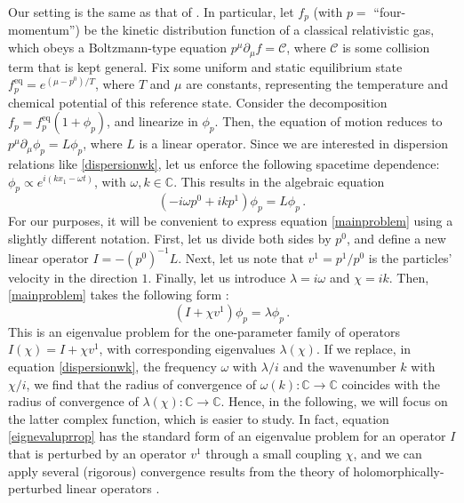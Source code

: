 \documentclass[a4paper, amsfonts, amssymb, amsmath, reprint, showkeys, nofootinbib, twoside, onecolumn,notitlepage]{revtex4-2}
\theoremstyle{definition}
\theoremstyle{theorem}
\theoremstyle{corollary}
\begin{document}
Our setting is the same as that of \cite{GavassinoGapless2024rck}. In particular, let $f_p$ (with $p=$ ``four-momentum'') be the kinetic distribution function of a classical relativistic gas, which obeys a Boltzmann-type equation $p^\mu \partial_\mu f=\mathcal{C}$, where $\mathcal{C}$ is some collision term that is kept general. Fix some uniform and static equilibrium state $f^{\text{eq}}_p=e^{(\mu-p^0)/T}$, where $T$ and $\mu$ are constants, representing the temperature and chemical potential of this reference state. Consider the decomposition $f_p=f^{\text{eq}}_p(1+\phi_p)$, and linearize in $\phi_p$. Then, the equation of motion reduces to $p^\mu \partial_\mu \phi_p=L\phi_p$, where $L$ is a linear operator. Since we are interested in dispersion relations like \eqref{dispersionwk}, let us enforce the following spacetime dependence: $\phi_p \propto e^{i(k x_1-\omega t)}$, with $\omega,k \in \mathbb{C}$. This results in the algebraic equation
\begin{equation}\label{mainproblem}
(-i\omega p^0+ikp^1)\phi_p=L\phi_p \, .
\end{equation}
For our purposes, it will be convenient to express equation \eqref{mainproblem} using a slightly different notation. First, let us divide both sides by $p^0$, and define a new linear operator $I=-(p^0)^{-1}L$. Next, let us note that $v^1=p^1/p^0$ is the particles' velocity in the direction $1$. Finally, let us introduce $\lambda = i\omega$ and $\chi = ik$. Then, \eqref{mainproblem} takes the following form \cite{McLennan1965}:
\begin{equation}\label{eignevaluprrop}
(I{+}\chi v^1)\phi_p = \lambda \phi_p \, .
\end{equation}
This is an eigenvalue problem for the one-parameter family of operators $I(\chi)=I+\chi v^1$, with corresponding eigenvalues $\lambda(\chi)$. If we replace, in equation \eqref{dispersionwk}, the frequency $\omega$ with $\lambda/i$ and the wavenumber $k$ with $\chi/i$, we find that the radius of convergence of $\omega(k):\mathbb{C}\rightarrow \mathbb{C}$ coincides with the radius of convergence of $\lambda(\chi):\mathbb{C}\rightarrow \mathbb{C}$. Hence, in the following, we will focus on the latter complex function, which is easier to study. In fact, equation \eqref{eignevaluprrop} has the standard form of an eigenvalue problem for an operator $I$ that is perturbed by an operator $v^1$ through a small coupling $\chi$, and we can apply several (rigorous) convergence results from the theory of holomorphically-perturbed linear operators \cite{Kato_book}.
\end{document}
